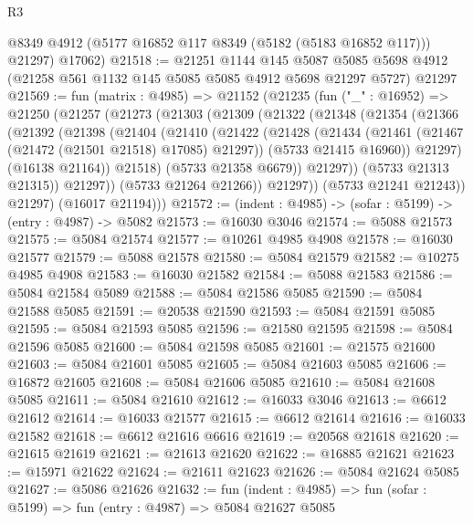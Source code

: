 \begin{lexlean}{R3}
\begin{coremodule}
        @8349
        @4912
        (@5177 @16852 @117 @8349 (@5182 (@5183 @16852 @117)))
        @21297)
      @17062)
@21518 := @21251
    @1144
    @145
    @5087
    @5085
    @5698
    @4912
    (@21258 @561 @1132 @145 @5085 @5085 @4912 @5698 @21297 @5727)
    @21297
@21569 := fun (matrix : @4985) =>
  @21152
    (@21235
      (fun ("_" : @16952) =>
      @21250
        (@21257
          (@21273
            (@21303
              (@21309
                (@21322
                  (@21348
                    (@21354
                      (@21366
                        (@21392
                          (@21398
                            (@21404
                              (@21410
                                (@21422
                                  (@21428
                                    (@21434
                                      (@21461 (@21467 (@21472 (@21501 @21518) @17085) @21297))
                                      (@5733 @21415 @16960))
                                    @21297)
                                  (@16138 @21164))
                                @21518)
                              (@5733 @21358 @6679))
                            @21297))
                        (@5733 @21313 @21315))
                      @21297))
                  (@5733 @21264 @21266))
                @21297))
            (@5733 @21241 @21243))
          @21297)
        (@16017 @21194)))
@21572 := (indent : @4985) -> (sofar : @5199) -> (entry : @4987) -> @5082
@21573 := @16030 @3046
@21574 := @5088 @21573
@21575 := @5084 @21574
@21577 := @10261 @4985 @4908
@21578 := @16030 @21577
@21579 := @5088 @21578
@21580 := @5084 @21579
@21582 := @10275 @4985 @4908
@21583 := @16030 @21582
@21584 := @5088 @21583
@21586 := @5084 @21584 @5089
@21588 := @5084 @21586 @5085
@21590 := @5084 @21588 @5085
@21591 := @20538 @21590
@21593 := @5084 @21591 @5085
@21595 := @5084 @21593 @5085
@21596 := @21580 @21595
@21598 := @5084 @21596 @5085
@21600 := @5084 @21598 @5085
@21601 := @21575 @21600
@21603 := @5084 @21601 @5085
@21605 := @5084 @21603 @5085
@21606 := @16872 @21605
@21608 := @5084 @21606 @5085
@21610 := @5084 @21608 @5085
@21611 := @5084 @21610
@21612 := @16033 @3046
@21613 := @6612 @21612
@21614 := @16033 @21577
@21615 := @6612 @21614
@21616 := @16033 @21582
@21618 := @6612 @21616 @6616
@21619 := @20568 @21618
@21620 := @21615 @21619
@21621 := @21613 @21620
@21622 := @16885 @21621
@21623 := @15971 @21622
@21624 := @21611 @21623
@21626 := @5084 @21624 @5085
@21627 := @5086 @21626
@21632 := fun (indent : @4985) => fun (sofar : @5199) => fun (entry : @4987) => @5084 @21627 @5085

\end{coremodule}
\end{lexlean}
